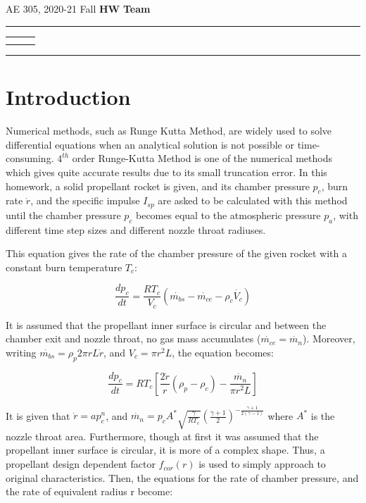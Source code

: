 \documentclass[letterpaper,12pt]{article}
\begin{document}
\begin{center}
AE 305, 2020-21 Fall \hfill \textbf{HW \HWno} \hfill \textbf{Team \TeamNo} \\
\noindent\rule{\textwidth}{0.4pt}
\begin{tabular}{p{} | p{} | p{} }
	\AuthorOneName&\AuthorTwoName&\AuthorThreeName\\
	\textit{\AuthorOneID}&\textit{\AuthorTwoID}&\textit{\AuthorThreeID}
\end{tabular}
\noindent\rule{\textwidth}{0.4pt}
\end{center}


\section{Introduction}

Numerical methods, such as Runge Kutta Method, are widely used to solve differential equations when an
analytical solution is not possible or time-consuming. $4^{th}$ order Runge-Kutta Method is one of the
numerical methods which gives quite accurate results due to its small truncation error. In this homework,
a solid propellant rocket is given, and its chamber pressure $p_c$, burn rate $\dot{r}$, and the specific
impulse $I_{sp}$ are asked to be calculated with this method until the chamber pressure $p_c$ becomes equal
to the atmospheric pressure $p_a$, with different time step sizes and different nozzle throat radiuses.

This equation gives the rate of the chamber pressure of the given rocket with a constant burn temperature
$T_c$:

\begin{equation}
	\frac{dp_c}{dt} = \frac{RT_c}{V_c}(\dot{m_{bs}} - \dot{m_{ce}} - \rho_{c}\dot{V_c})
\end{equation}

It is assumed that the propellant inner surface is circular and between the chamber exit and nozzle throat,
no gas mass accumulates ($\dot{m_{ce}} = \dot{m_n}$). Moreover, writing $\dot{m_{bs}} = \rho_{p}2\pi rL\dot{r}$,
and $V_c = \pi r^{2}L$, the equation becomes:

\begin{equation}
	\frac{dp_c}{dt} = RT_c[\frac{2\dot{r}}{r}(\rho_{p} - \rho_{c}) - \frac{\dot{m_n}}{\pi r^{2}L}]
\end{equation}

It is given that $\dot{r} = ap_c^{n}$, and $\dot{m_n} = p_cA^{*}\sqrt{\frac{\gamma}{RT_c}}(\frac{\gamma +1}{2})^{-\frac{\gamma +1}{2(\gamma -1)}}$
where $A^{*}$ is the nozzle throat area. Furthermore, though at first it was assumed that the propellant 
inner surface is circular, it is more of a complex shape. Thus, a propellant design dependent factor
$f_{cor}(r)$ is used to simply approach to original characteristics. Then, the equations for the rate
of chamber pressure, and the rate of equivalent radius r become:
\end{document}
